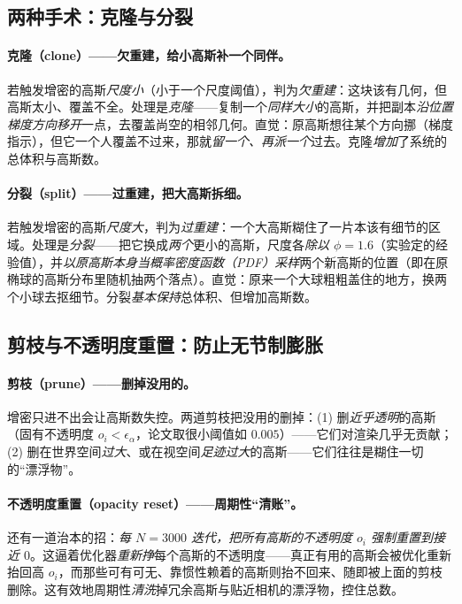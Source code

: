 \subsection{两种手术：克隆与分裂}

\paragraph{克隆（clone）——欠重建，给小高斯补一个同伴。}
若触发增密的高斯\emph{尺度小}（小于一个尺度阈值），判为\emph{欠重建}：这块该有几何，但高斯太小、覆盖不全。处理是\emph{克隆}——复制一个\emph{同样大小}的高斯，并把副本\emph{沿位置梯度方向移开}一点，去覆盖尚空的相邻几何。直觉：原高斯想往某个方向挪（梯度指示），但它一个人覆盖不过来，那就\emph{留一个、再派一个}过去。克隆\emph{增加}了系统的总体积与高斯数。

\paragraph{分裂（split）——过重建，把大高斯拆细。}
若触发增密的高斯\emph{尺度大}，判为\emph{过重建}：一个大高斯糊住了一片本该有细节的区域。处理是\emph{分裂}——把它换成\emph{两个}更小的高斯，尺度各\emph{除以 $\phi=1.6$}（实验定的经验值），并\emph{以原高斯本身当概率密度函数（PDF）采样}两个新高斯的位置（即在原椭球的高斯分布里随机抽两个落点）。直觉：原来一个大球粗粗盖住的地方，换两个小球去抠细节。分裂\emph{基本保持}总体积、但增加高斯数。

\subsection{剪枝与不透明度重置：防止无节制膨胀}

\paragraph{剪枝（prune）——删掉没用的。}
增密只进不出会让高斯数失控。两道剪枝把没用的删掉：(1) 删\emph{近乎透明}的高斯（固有不透明度 $o_i<\epsilon_\alpha$，论文取很小阈值如 $0.005$）——它们对渲染几乎无贡献；(2) 删在世界空间\emph{过大}、或在视空间\emph{足迹过大}的高斯——它们往往是糊住一切的“漂浮物”。

\paragraph{不透明度重置（opacity reset）——周期性“清账”。}
还有一道治本的招：\emph{每 $N=3000$ 迭代，把所有高斯的不透明度 $o_i$ 强制重置到接近 $0$}。这逼着优化器\emph{重新挣}每个高斯的不透明度——真正有用的高斯会被优化重新抬回高 $o_i$，而那些可有可无、靠惯性赖着的高斯则抬不回来、随即被上面的剪枝删除。这有效地周期性\emph{清洗}掉冗余高斯与贴近相机的漂浮物，控住总数。

